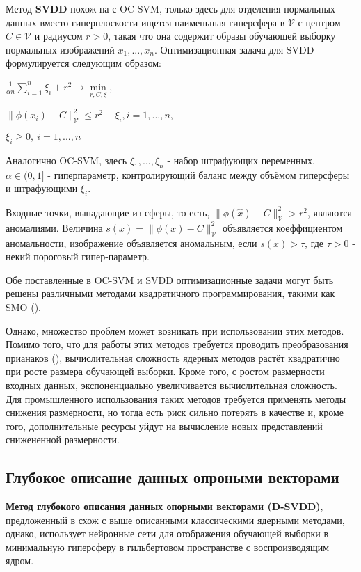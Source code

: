 \documentclass{article}
\begin{document}
\begin{large}
Метод \textbf{SVDD} \cite{svdd} похож на с OC-SVM, только здесь для отделения нормальных данных вместо гиперплоскости ищется наименьшая гиперсфера в $\mathcal{V}$ с центром $C \in \mathcal{V}$ и радиусом $r > 0$, такая что она содержит образы обучающей выборку нормальных изображений $x_1, ..., x_n$. Оптимизационная задача для SVDD формулируется следующим образом:
\begin{center}
	$\frac{1}{\alpha n} \sum\limits_{i=1}^{n} \xi_i + r^2 \rightarrow \min\limits_{r, C, \xi}$,
	
	$\|\phi(x_i) - C \|^2_{\mathcal{V}} \le r^2 + \xi_i, i = 1, ..., n$,
	
	$\xi_i \ge 0, \ i = 1, ..., n$
\end{center}

Аналогично OC-SVM, здесь $\xi_1, ..., \xi_n$ - набор штрафующих переменных, $\alpha \in (0, 1]$ - гиперпараметр, контролирующий баланс между объёмом гиперсферы и штрафующими $\xi_i$.

Входные точки, выпадающие из сферы, то есть, $\|\phi(\hat x) - C \|^2_{\mathcal{V}} > r^2$, являются аномалиями. Величина $s(x) = \|\phi(x) - C \|^2_{\mathcal{V}}$ объявляется коеффициентом аномальности, изображение объявляется аномальным, если $s(x) > \tau$, где $\tau > 0$ - некий пороговый гипер-параметр.

Обе поставленные в OC-SVM и SVDD оптимизационные задачи могут быть решены различными методами квадратичного программирования, такими как SMO (\cite{smo}).

Однако, множество проблем может возникать при использовании этих методов. Помимо того, что для работы этих методов требуется проводить преобразования прианаков (\cite{svm_feature_selection}), вычислительная сложность ядерных методов растёт квадратично \cite{svm_compute} при росте размера обучающей выборки. Кроме того, с ростом размерности входных данных, экспоненциально увеличивается вычислительная сложность. Для промышленного использования таких методов требуется применять методы снижения размерности, но тогда есть риск сильно потерять в качестве и, кроме того, дополнительные ресурсы уйдут на вычисление новых представлений снижененной размерности.

\subsection{Глубокое описание данных опроными векторами}

\textbf{Метод глубокого описания данных опорными векторами (D-SVDD)}, предложенный в \cite{claasical_nn} схож с выше описанными классическими ядерными методами, однако, использует нейронные сети для отображения обучающей выборки в минимальную гиперсферу в гильбертовом пространстве с воспроизводящим ядром.


\end{large}
\end{document}
